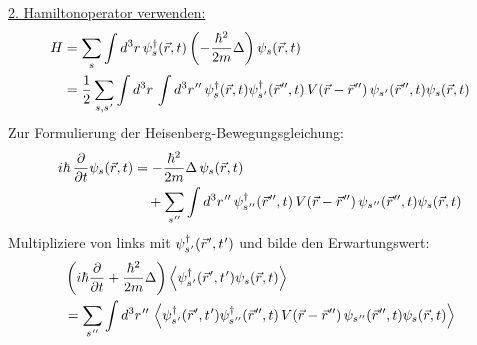 \underline{2. Hamiltonoperator verwenden:}
\begin{equation}
  \begin{aligned}
    H
     & = \sum_s\int d^3r\,\psi_s^{\dagger}(\vec{r},t)\left(-\frac{\hbar^2}{2m}\Delta\right)\psi_s(\vec{r},t)                                                                                                                                     \\
     & = \frac{1}{2}\sum_{s,s\mkern1mu'}\int d^3r\,\int d^3r\mkern1mu''\,\psi_s^{\dagger}(\vec{r},t)\psi_{s\mkern1mu'}^{\dagger}(\vec{r}\mkern1mu'',t)\,V(\vec{r}-\vec{r}\mkern1mu'')\,\psi_{s\mkern1mu'}(\vec{r}\mkern1mu'',t)\psi_s(\vec{r},t)
  \end{aligned}
\end{equation}
Zur Formulierung der Heisenberg-Bewegungsgleichung:
\begin{equation}
  \begin{aligned}
    i\hbar\,\frac{\partial}{\partial t}\psi_s(\vec{r},t)
     & = -\frac{\hbar^2}{2m}\Delta\,\psi_s(\vec{r},t)                                                                                                                                                  \\
     & \quad + \sum_{s\mkern1mu''}\int d^3r\mkern1mu''\,\psi_{s\mkern1mu''}^{\dagger}(\vec{r}\mkern1mu'',t)\,V(\vec{r}-\vec{r}\mkern1mu'')\,\psi_{s\mkern1mu''}(\vec{r}\mkern1mu'',t)\psi_s(\vec{r},t)
  \end{aligned}
\end{equation}
Multipliziere von links mit $\psi_{s\mkern1mu'}^{\dagger}(\vec{r}\mkern1mu',t\mkern1mu')$ und bilde den Erwartungswert:
\begin{equation}\label{Heisenberg_Erwartungswert}
  \begin{aligned}
     & \left(i\hbar\frac{\partial}{\partial t}+\frac{\hbar^2}{2m}\Delta\right)\left\langle\psi_{s\mkern1mu'}^{\dagger}(\vec{r}\mkern1mu',t\mkern1mu')\psi_s(\vec{r},t)\right\rangle                                                                                                  \\
     & = \sum_{s\mkern1mu''}\int d^3r\mkern1mu''\,\left\langle\psi_{s\mkern1mu'}^{\dagger}(\vec{r}\mkern1mu',t\mkern1mu')\psi_{s\mkern1mu''}^{\dagger}(\vec{r}\mkern1mu'',t)\,V(\vec{r}-\vec{r}\mkern1mu'')\,\psi_{s\mkern1mu''}(\vec{r}\mkern1mu'',t)\psi_s(\vec{r},t)\right\rangle
  \end{aligned}
\end{equation}

